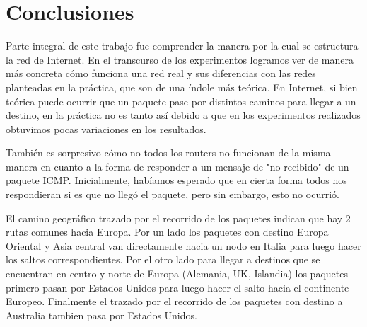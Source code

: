 \section{Conclusiones}
\PARstart Parte integral de este trabajo fue comprender la manera por la cual se estructura la red de Internet. 
En el transcurso de los experimentos logramos ver de manera más concreta cómo funciona una red real y sus diferencias
con las redes planteadas en la práctica, que son de una índole más teórica. 
En Internet, si bien teórica puede ocurrir que un paquete pase por distintos caminos para llegar a un destino, 
en la práctica no es tanto así debido a que en los experimentos realizados obtuvimos pocas variaciones en los resultados.

También es sorpresivo cómo no todos los routers no funcionan de la misma manera en cuanto a la forma de responder
a un mensaje de "no recibido" de un paquete ICMP. Inicialmente, habíamos esperado que en cierta forma todos nos respondieran
si es que no llegó el paquete, pero sin embargo, esto no ocurrió.

El camino geográfico trazado por el recorrido de los paquetes indican que hay 2 rutas comunes hacia Europa. Por un lado los paquetes 
con destino Europa Oriental y Asia central van directamente hacia un nodo en Italia para luego hacer los saltos correspondientes.
Por el otro lado para llegar a destinos que se encuentran en centro y norte de Europa (Alemania, UK, Islandia)
los paquetes primero pasan por Estados Unidos para luego hacer el salto hacia el continente Europeo.
Finalmente el trazado por el recorrido de los paquetes con destino a Australia tambien pasa por Estados Unidos.
